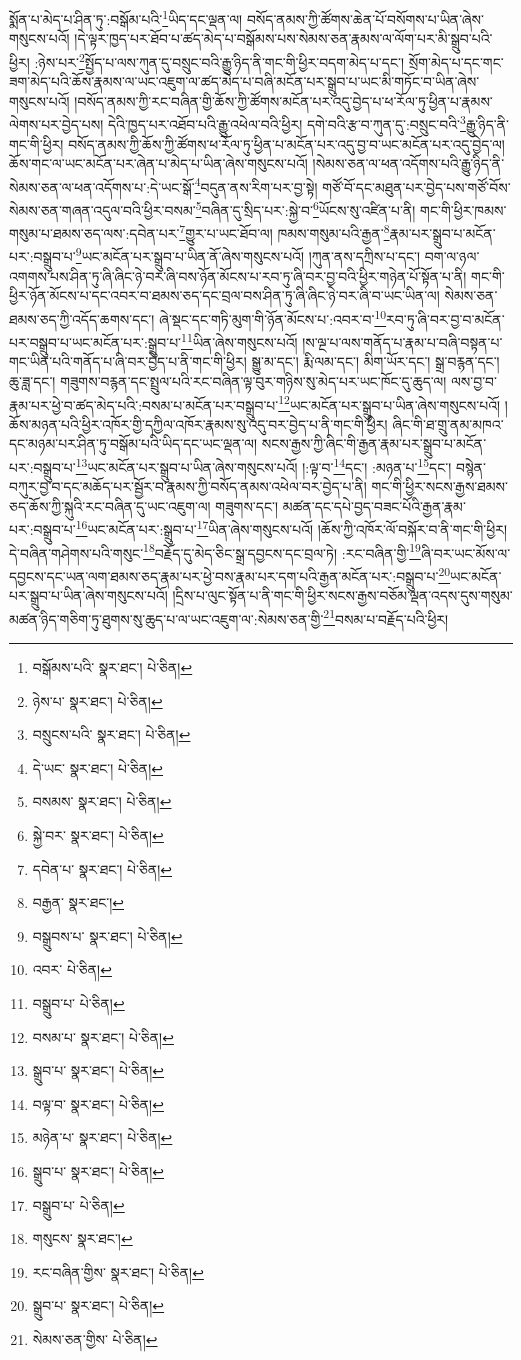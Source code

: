 སྨོན་པ་མེད་པ་ཤིན་ཏུ་:བསྒོམ་པའི་\footnote{བསྒོམས་པའི་  སྣར་ཐང་།  པེ་ཅིན། }ཡིད་དང་ལྡན་ལ། བསོད་ནམས་ཀྱི་ཚོགས་ཆེན་པོ་བསོགས་པ་ཡིན་ཞེས་གསུངས་པའོ། །དེ་ལྟར་ཁྱད་པར་ཐོབ་པ་ཚད་མེད་པ་བསྒོམས་པས་སེམས་ཅན་རྣམས་ལ་ལོག་པར་མི་སྒྲུབ་པའི་ཕྱིར། :ཉེས་པར་\footnote{ཉེས་པ་  སྣར་ཐང་།  པེ་ཅིན། }སྤྱོད་པ་ལས་ཀུན་དུ་བསྲུང་བའི་རྒྱུ་ཉིད་ནི་གང་གི་ཕྱིར་བདག་མེད་པ་དང་། སྲོག་མེད་པ་དང་གང་ཟག་མེད་པའི་ཆོས་རྣམས་ལ་ཡང་འཇུག་ལ་ཚད་མེད་པ་བཞི་མངོན་པར་སྒྲུབ་པ་ཡང་མི་གཏོང་བ་ཡིན་ཞེས་གསུངས་པའོ། །བསོད་ནམས་ཀྱི་རང་བཞིན་གྱི་ཆོས་ཀྱི་ཚོགས་མངོན་པར་འདུ་བྱེད་པ་ཕ་རོལ་ཏུ་ཕྱིན་པ་རྣམས་ལེགས་པར་བྱེད་པས། དེའི་ཁྱད་པར་འཐོབ་པའི་རྒྱུ་འཕེལ་བའི་ཕྱིར། དགེ་བའི་རྩ་བ་ཀུན་དུ་:བསྲུང་བའི་\footnote{བསྲུངས་པའི་  སྣར་ཐང་།  པེ་ཅིན། }རྒྱུ་ཉིད་ནི་གང་གི་ཕྱིར། བསོད་ནམས་ཀྱི་ཆོས་ཀྱི་ཚོགས་ཕ་རོལ་ཏུ་ཕྱིན་པ་མངོན་པར་འདུ་བྱ་བ་ཡང་མངོན་པར་འདུ་བྱེད་ལ། ཆོས་གང་ལ་ཡང་མངོན་པར་ཞེན་པ་མེད་པ་ཡིན་ཞེས་གསུངས་པའོ། །སེམས་ཅན་ལ་ཕན་འདོགས་པའི་རྒྱུ་ཉིད་ནི་སེམས་ཅན་ལ་ཕན་འདོགས་པ་:དེ་ཡང་སྒོ་\footnote{དེ་ཡང་  སྣར་ཐང་།  པེ་ཅིན། }བདུན་ནས་རིག་པར་བྱ་སྟེ། གཙོ་བོ་དང་མཐུན་པར་བྱེད་པས་གཙོ་བོས་སེམས་ཅན་གཞན་འདུལ་བའི་ཕྱིར་བསམ་\footnote{བསམས་  སྣར་ཐང་།  པེ་ཅིན། }བཞིན་དུ་སྲིད་པར་:སྐྱེ་བ་\footnote{སྐྱེ་བར་  སྣར་ཐང་།  པེ་ཅིན། }ཡོངས་སུ་འཛིན་པ་ནི། གང་གི་ཕྱིར་ཁམས་གསུམ་པ་ཐམས་ཅད་ལས་:དབེན་པར་\footnote{དབེན་པ་  སྣར་ཐང་།  པེ་ཅིན། }གྱུར་པ་ཡང་ཐོབ་ལ། ཁམས་གསུམ་པའི་རྒྱན་\footnote{བརྒྱན་  སྣར་ཐང་། }རྣམ་པར་སྒྲུབ་པ་མངོན་པར་:བསྒྲུབ་པ་\footnote{བསྒྲུབས་པ་  སྣར་ཐང་།  པེ་ཅིན། }ཡང་མངོན་པར་སྒྲུབ་པ་ཡིན་ནོ་ཞེས་གསུངས་པའོ། །ཀུན་ནས་དཀྲིས་པ་དང་། བག་ལ་ཉལ་འགགས་པས་ཤིན་ཏུ་ཞི་ཞིང་ཉེ་བར་ཞི་བས་ཉོན་མོངས་པ་རབ་ཏུ་ཞི་བར་བྱ་བའི་ཕྱིར་གཉེན་པོ་སྟོན་པ་ནི། གང་གི་ཕྱིར་ཉོན་མོངས་པ་དང་འབར་བ་ཐམས་ཅད་དང་བྲལ་བས་ཤིན་ཏུ་ཞི་ཞིང་ཉེ་བར་ཞི་བ་ཡང་ཡིན་ལ། སེམས་ཅན་ཐམས་ཅད་ཀྱི་འདོད་ཆགས་དང་། ཞེ་སྡང་དང་གཏི་མུག་གི་ཉོན་མོངས་པ་:འབར་བ་\footnote{འབར་  པེ་ཅིན། }རབ་ཏུ་ཞི་བར་བྱ་བ་མངོན་པར་བསྒྲུབ་པ་ཡང་མངོན་པར་:སྒྲུབ་པ་\footnote{བསྒྲུབ་པ་  པེ་ཅིན། }ཡིན་ཞེས་གསུངས་པའོ། །ས་ལྔ་པ་ལས་གནོད་པ་རྣམ་པ་བཞི་བསྟན་པ་གང་ཡིན་པའི་གནོད་པ་ཞི་བར་བྱེད་པ་ནི་གང་གི་ཕྱིར། སྒྱུ་མ་དང་། རྨི་ལམ་དང་། མིག་ཡོར་དང་། སྒྲ་བརྙན་དང་། ཆུ་ཟླ་དང་། གཟུགས་བརྙན་དང་སྤྲུལ་པའི་རང་བཞིན་ལྟ་བུར་གཉིས་སུ་མེད་པར་ཡང་ཁོང་དུ་ཆུད་ལ། ལས་བྱ་བ་རྣམ་པར་ཕྱེ་བ་ཚད་མེད་པའི་:བསམ་པ་མངོན་པར་བསྒྲུབ་པ་\footnote{བསམ་པ་  སྣར་ཐང་།  པེ་ཅིན། }ཡང་མངོན་པར་སྒྲུབ་པ་ཡིན་ཞེས་གསུངས་པའོ། །ཆོས་མཉན་པའི་ཕྱིར་འཁོར་གྱི་དཀྱིལ་འཁོར་རྣམས་སུ་འདུ་བར་བྱེད་པ་ནི་གང་གི་ཕྱིར། ཞིང་གི་ཐ་གྲུ་ནམ་མཁའ་དང་མཉམ་པར་ཤིན་ཏུ་བསྒོམ་པའི་ཡིད་དང་ཡང་ལྡན་ལ། སངས་རྒྱས་ཀྱི་ཞིང་གི་རྒྱན་རྣམ་པར་སྒྲུབ་པ་མངོན་པར་:བསྒྲུབ་པ་\footnote{སྒྲུབ་པ་  སྣར་ཐང་།  པེ་ཅིན། }ཡང་མངོན་པར་སྒྲུབ་པ་ཡིན་ཞེས་གསུངས་པའོ། །:ལྟ་བ་\footnote{བལྟ་བ་  སྣར་ཐང་།  པེ་ཅིན། }དང་། :མཉན་པ་\footnote{མཉེན་པ་  སྣར་ཐང་།  པེ་ཅིན། }དང་། བསྙེན་བཀུར་བྱ་བ་དང་མཆོད་པར་སྦྱོར་བ་རྣམས་ཀྱི་བསོད་ནམས་འཕེལ་བར་བྱེད་པ་ནི། གང་གི་ཕྱིར་སངས་རྒྱས་ཐམས་ཅད་ཆོས་ཀྱི་སྐུའི་རང་བཞིན་དུ་ཡང་འཇུག་ལ། གཟུགས་དང་། མཚན་དང་དཔེ་བྱད་བཟང་པོའི་རྒྱན་རྣམ་པར་:བསྒྲུབ་པ་\footnote{སྒྲུབ་པ་  སྣར་ཐང་།  པེ་ཅིན། }ཡང་མངོན་པར་:སྒྲུབ་པ་\footnote{བསྒྲུབ་པ་  པེ་ཅིན། }ཡིན་ཞེས་གསུངས་པའོ། །ཆོས་ཀྱི་འཁོར་ལོ་བསྐོར་བ་ནི་གང་གི་ཕྱིར། དེ་བཞིན་གཤེགས་པའི་གསུང་\footnote{གསུངས་  སྣར་ཐང་། }བརྗོད་དུ་མེད་ཅིང་སྒྲ་དབྱངས་དང་བྲལ་ཏེ། :རང་བཞིན་གྱི་\footnote{རང་བཞིན་གྱིས་  སྣར་ཐང་།  པེ་ཅིན། }ཞི་བར་ཡང་མོས་ལ་དབྱངས་དང་ཡན་ལག་ཐམས་ཅད་རྣམ་པར་ཕྱེ་བས་རྣམ་པར་དག་པའི་རྒྱན་མངོན་པར་:བསྒྲུབ་པ་\footnote{སྒྲུབ་པ་  སྣར་ཐང་།  པེ་ཅིན། }ཡང་མངོན་པར་སྒྲུབ་པ་ཡིན་ཞེས་གསུངས་པའོ། །དྲིས་པ་ལུང་སྟོན་པ་ནི་གང་གི་ཕྱིར་སངས་རྒྱས་བཅོམ་ལྡན་འདས་དུས་གསུམ་མཚན་ཉིད་གཅིག་ཏུ་ཐུགས་སུ་ཆུད་པ་ལ་ཡང་འཇུག་ལ་:སེམས་ཅན་གྱི་\footnote{སེམས་ཅན་གྱིས་  པེ་ཅིན། }བསམ་པ་བརྗོད་པའི་ཕྱིར། 